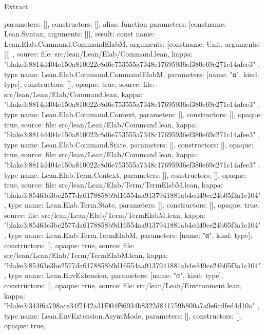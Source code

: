 \begin{lexlean}{Extract}
\begin{toolingmodule}
{{      parameters: [],
      constructors: [],
      alias: function{
        parameters: [const{name: Lean.Syntax, arguments: []}],
        result: const{
          name: Lean.Elab.Command.CommandElabM,
          arguments: [const{name: Unit, arguments: []}]
        }
      },
      source: {
        file: src/lean/Lean/Elab/Command.lean,
        kappa: "blake3:8814d404c150a810022c8d6e753555a7348c17695936ef380e69c271c14afee3"
      }
    },
    type{
      name: Lean.Elab.Command.CommandElabM,
      parameters: [{name: "α", kind: type{}}],
      constructors: [],
      opaque: true,
      source: {
        file: src/lean/Lean/Elab/Command.lean,
        kappa: "blake3:8814d404c150a810022c8d6e753555a7348c17695936ef380e69c271c14afee3"
      }
    },
    type{
      name: Lean.Elab.Command.Context,
      parameters: [],
      constructors: [],
      opaque: true,
      source: {
        file: src/lean/Lean/Elab/Command.lean,
        kappa: "blake3:8814d404c150a810022c8d6e753555a7348c17695936ef380e69c271c14afee3"
      }
    },
    type{
      name: Lean.Elab.Command.State,
      parameters: [],
      constructors: [],
      opaque: true,
      source: {
        file: src/lean/Lean/Elab/Command.lean,
        kappa: "blake3:8814d404c150a810022c8d6e753555a7348c17695936ef380e69c271c14afee3"
      }
    },
    type{
      name: Lean.Elab.Term.Context,
      parameters: [],
      constructors: [],
      opaque: true,
      source: {
        file: src/lean/Lean/Elab/Term/TermElabM.lean,
        kappa: "blake3:85463e3be2577da6178858b9d16554aa9137941881ab4ed49ce24b05f3a1c104"
      }
    },
    type{
      name: Lean.Elab.Term.State,
      parameters: [],
      constructors: [],
      opaque: true,
      source: {
        file: src/lean/Lean/Elab/Term/TermElabM.lean,
        kappa: "blake3:85463e3be2577da6178858b9d16554aa9137941881ab4ed49ce24b05f3a1c104"
      }
    },
    type{
      name: Lean.Elab.Term.TermElabM,
      parameters: [{name: "α", kind: type{}}],
      constructors: [],
      opaque: true,
      source: {
        file: src/lean/Lean/Elab/Term/TermElabM.lean,
        kappa: "blake3:85463e3be2577da6178858b9d16554aa9137941881ab4ed49ce24b05f3a1c104"
      }
    },
    type{
      name: Lean.EnvExtension,
      parameters: [{name: "σ", kind: type{}}],
      constructors: [],
      opaque: true,
      source: {
        file: src/lean/Lean/Environment.lean,
        kappa: "blake3:343f6a798ace34f2142a31f004f86934b8322d811759b800a7a9e6cdfed4d10a"
      }
    },
    type{
      name: Lean.EnvExtension.AsyncMode,
      parameters: [],
      constructors: [],
      opaque: true,
}}
\end{toolingmodule}
\end{lexlean}
